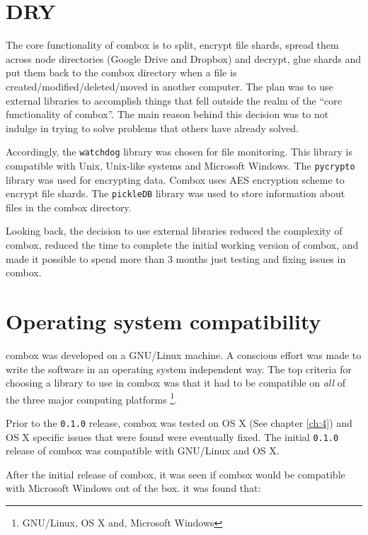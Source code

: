 \section{DRY}

The core functionality of combox is to split, encrypt file shards,
spread them across node directories (Google Drive and Dropbox) and
decrypt, glue shards and put them back to the combox directory when a
file is created/modified/deleted/moved in another computer. The plan
was to use external libraries to accomplish things that fell outside
the realm of the ``core functionality of combox''. The main reason
behind this decision was to not indulge in trying to solve problems
that others have already solved.

Accordingly, the \verb+watchdog+\cite{pylib:watchdog} library was chosen for file
monitoring. This library is compatible with Unix, Unix-like systems
and Microsoft Windows. The \verb+pycrypto+
library \cite{pylib:pycrypto} was used for encrypting data. Combox uses
AES encryption scheme to encrypt file shards. The
\verb+pickleDB+ \cite{pylib:pickledb} library was used to store
information about files in the combox directory.

Looking back, the decision to use external libraries reduced the
complexity of combox, reduced the time to complete the initial working
version of combox, and made it possible to spend more than 3 months
just testing and fixing issues in combox.

\section{Operating system compatibility}\label{3-os-compat}

combox was developed on a GNU/Linux machine. A conscious effort was
made to write the software in an operating system independent way. The top criteria
for choosing a library to use in combox was that it had to be
compatible on \emph{all} of the three major computing
platforms \footnote{GNU/Linux, OS X and, Microsoft Windows}.

Prior to the \verb+0.1.0+ release, combox was tested on OS X (See
chapter \ref{ch:4}) and OS X specific issues that were found were
eventually fixed. The initial \verb+0.1.0+ release of combox was
compatible with GNU/Linux and OS X.

After the initial release of combox, it was seen if combox would be
compatible with Microsoft Windows out of the box. it was found that:

